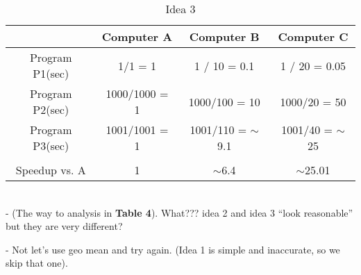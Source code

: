 \documentclass[12pt]{article}
\begin{document}
\begin{itemize}
\begin{itemize}
\begin{table}[]
                                        \begin{tabular}{cccc}
\hline
\multicolumn{1}{|c|}{}                & \multicolumn{1}{c|}{Computer A}    & \multicolumn{1}{c|}{Computer B}           & \multicolumn{1}{c|}{Computer C}         \\ \hline
\multicolumn{1}{|c|}{Program P1(sec)} & \multicolumn{1}{c|}{1/1 = 1}       & \multicolumn{1}{c|}{1 / 10 = 0.1}         & \multicolumn{1}{c|}{1 / 20 = 0.05}      \\ \hline
\multicolumn{1}{|c|}{Program P2(sec)} & \multicolumn{1}{c|}{1000/1000 = 1} & \multicolumn{1}{c|}{1000/100 = 10}        & \multicolumn{1}{c|}{1000/20 = 50}       \\ \hline
\multicolumn{1}{|c|}{Program P3(sec)} & \multicolumn{1}{c|}{1001/1001 = 1} & \multicolumn{1}{c|}{1001/110 = $\sim$9.1} & \multicolumn{1}{c|}{1001/40 = $\sim$25} \\ \hline
                                      &                                    &                                           &                                         \\ \hline
\multicolumn{1}{|c|}{Speedup vs. A}   & \multicolumn{1}{c|}{1}             & \multicolumn{1}{c|}{$\sim$6.4}            & \multicolumn{1}{c|}{$\sim$25.01}        \\ \hline
\end{tabular}
                                        \caption{Idea 3}
                                        \label{tab:my_label}
                                    \end{table}
                                    \\- (The way to analysis in \textbf{Table 4}). What??? idea 2 and idea 3 “look reasonable” but they are very different?
                            \end{itemize}
                \end{itemize}
            - Not let's use geo mean and try again. (Idea 1 is simple and inaccurate, so we skip that one).
\end{document}
